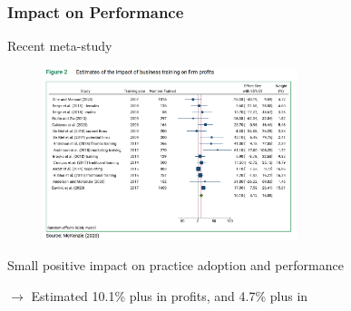 \documentclass[hideothersubsections, usenames,dvipsnames,11pt]{beamer}
\newenvironment{itemize_2pt}{\itemize\addtolength{\itemsep}{2pt}}{\enditemize}
\begin{document}
\begin{frame}[label=McK2020_profits]
\frametitle{Impact on Performance}
	
	Recent meta-study \citep{McKenzie2021}
	
\vspace{-0.5em}	
	
	\begin{figure}[htbp]
		\centering
		\includegraphics[width=20em]{pics/McK2020_profits.png}
		\label{McKenzie(2020): Profits}
	\end{figure}	
	
	\vspace{-1em}	
	
	\begin{itemize_2pt}
		\item \textcolor{bdf}{Small positive impact} on practice adoption and performance 
		\item[] $\rightarrow$ Estimated 10.1\% plus in profits, and 4.7\% plus in \hyperlink{McK2020_sales}{}
	\end{itemize_2pt}
	
	
\end{frame}
\end{document}
